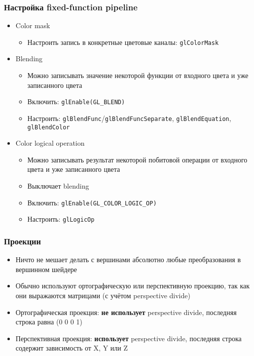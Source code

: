 \documentclass{beamer}
\begin{document}
\begin{frame}[fragile]
\frametitle{Настройка fixed-function pipeline}
\begin{itemize}
\item Color mask
\begin{itemize}
\item Настроить запись в конкретные цветовые каналы: \verb|glColorMask|
\end{itemize}
\pause
\item Blending
\begin{itemize}
\item Можно записывать значение некоторой функции от входного цвета и уже записанного цвета
\item Включить: \verb|glEnable(GL_BLEND)|
\item Настроить: \verb|glBlendFunc|/\verb|glBlendFuncSeparate|, \verb|glBlendEquation|, \verb|glBlendColor|
\end{itemize}
\pause
\item Color logical operation
\begin{itemize}
\item Можно записывать результат некоторой побитовой операции от входного цвета и уже записанного цвета
\item Выключает blending
\item Включить: \verb|glEnable(GL_COLOR_LOGIC_OP)|
\item Настроить: \verb|glLogicOp|
\end{itemize}
\end{itemize}
\end{frame}

\begin{frame}[fragile]
\frametitle{Проекции}
\begin{itemize}
\item Ничто не мешает делать с вершинами абсолютно любые преобразования в вершинном шейдере
\pause
\item Обычно используют ортографическую или перспективную проекцию, так как они выражаются матрицами (с учётом perspective divide)
\pause
\item Ортографическая проекция: \textbf{не использует} perspective divide, последняя строка равна (0 0 0 1)
\pause
\item Перспективная проекция: \textbf{использует} perspective divide, последняя строка содержит зависимость от X, Y или Z
\end{itemize}
\end{frame}
\end{document}
